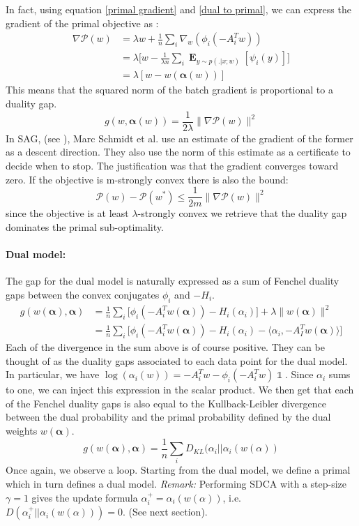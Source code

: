 \documentclass{article}
\DeclareMathOperator{\1}{\mathbb{1}}
\DeclareMathOperator{\E}{\mathbf{E}}
\begin{document}
In fact, using equation \ref{primal gradient} and \ref{dual to primal}, we can express the gradient of the primal objective 	as :
\begin{align*}
	\nabla \mathscr P(w) 
	& = \lambda w + \frac{1}{n} \sum_i \nabla_w(\phi_i(-A_i^Tw)) \\
	& = \lambda \bigg [ w - \frac{1}{\lambda n} \sum_i \E_{y \sim p(. | x ; w)} [\psi_i(y)] \bigg ] \\
	& = \lambda [ w - w(\bm \alpha(w))]
\end{align*}
This means that the squared norm of the batch gradient is proportional to a duality gap.
\begin{equation}
	g(w,\bm \alpha(w)) = \frac{1}{2 \lambda} \|\nabla \mathscr P(w)\|^2
\end{equation}
In SAG, (see \cite{schmidt_non-uniform_2015}), Marc Schmidt et al. use an estimate of the gradient of the former as a descent direction.
They also use the norm of this estimate as a certificate to decide when to stop.
The justification was that the gradient converges toward zero.
If the objective is m-strongly convex there is also the bound:
\begin{equation*}
	\mathscr P (w) - \mathscr P(w^*) \leq \frac{1}{2 m}\|\nabla \mathscr P (w)\|^2
\end{equation*}
since the objective is at least $\lambda$-strongly convex we retrieve that the duality gap dominates the primal sub-optimality.

\paragraph{Dual model:}
The gap for the dual model is naturally expressed as a sum of Fenchel duality gaps between the convex conjugates $\phi_i$ and $-H_i$. 
\begin{align*}
	g(w(\bm \alpha),\bm \alpha) 
	& = \frac{1}{n} \sum_i \big [ \phi_i(-A_i^Tw(\bm \alpha)) - H_i(\alpha_i) \big ] + \lambda \|w(\bm \alpha)\|^2 \\
	& =  \frac{1}{n} \sum_i \big [ \phi_i(-A_i^Tw(\bm \alpha)) - H_i(\alpha_i) - \langle \alpha_i,  -A_I^T w(\bm \alpha) \rangle \big ]
\end{align*}
Each of the divergence in the sum above is of course positive.
They can be thought of as the duality gaps associated to each data point for the dual model.
In particular, we have $\log(\alpha_i(w)) = -A_i^Tw - \phi_i(-A_i^Tw) \1$. Since $\alpha_i$ sums to one, we can inject this expression in the scalar product. We then get that each of the Fenchel duality gaps is also equal to the Kullback-Leibler divergence between the dual probability and the primal probability defined by the dual weights $w(\bm \alpha)$.
\begin{equation}
	\label{dual duality gaps}
	g(w(\bm \alpha),\bm \alpha) = \frac{1}{n} \sum_i D_{KL} (\alpha_i || \alpha_i(w(\alpha))
\end{equation}
Once again, we observe a loop. Starting from the dual model, we define a primal which in turn defines a dual model.
\textit{Remark:} Performing SDCA with a step-size $\gamma=1$ gives the update formula $\alpha_i^+ = \alpha_i(w(\alpha))$, i.e. $ D(\alpha_i^+ || \alpha_i(w(\alpha)) )=0$. (See next section).
\end{document}
